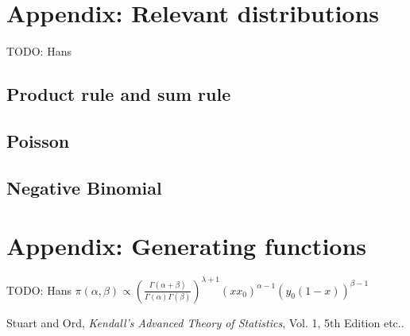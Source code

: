 \documentclass[11pt]{article}
\begin{document}
\section{Appendix: Relevant distributions}

TODO: Hans

\subsection{Product rule and sum rule}

\subsection{Poisson}

\subsection{Negative Binomial}

\section{Appendix: Generating functions}

TODO: Hans
$\pi(\alpha, \beta) \propto \left( \frac{\Gamma(\alpha+\beta)}{\Gamma(\alpha) \Gamma(\beta)} \right)^{\lambda +1} (x x_0)^{\alpha-1} \left(y_0 (1-x) \right)^{\beta-1}$



\begin{thebibliography}{99}
Stuart and Ord, \textit{Kendall's Advanced Theory of Statistics},
  Vol. 1, 5th Edition etc..

\end{thebibliography}


\end{document}

